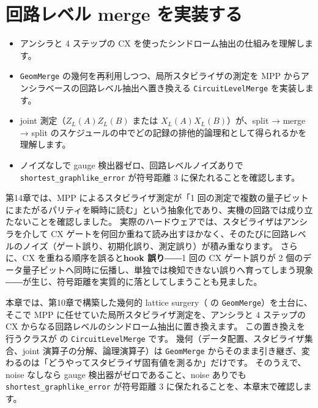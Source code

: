 \chapter{回路レベル merge を実装する}\label{ch:circuit_merge}

\begin{chaptergoal}
  \begin{itemize}
  \item アンシラと 4 ステップの CX を使ったシンドローム抽出の仕組みを理解します。
  \item \texttt{GeomMerge} の幾何を再利用しつつ、局所スタビライザの測定を MPP からアンシラベースの回路レベル抽出へ置き換える \texttt{CircuitLevelMerge} を実装します。
  \item joint 測定（$Z_L(A)Z_L(B)$ または $X_L(A)X_L(B)$）が、split → merge → split のスケジュールの中でどの記録の排他的論理和として得られるかを理解します。
  \item ノイズなしで gauge 検出器ゼロ、回路レベルノイズありで \texttt{shortest\_graphlike\_error} が符号距離 3 に保たれることを確認します。
  \end{itemize}
\end{chaptergoal}

第14章では、MPP によるスタビライザ測定が「1 回の測定で複数の量子ビットにまたがるパリティを瞬時に読む」という抽象化であり、実機の回路では成り立たないことを確認しました。
実際のハードウェアでは、スタビライザはアンシラを介して CX ゲートを何回か重ねて読み出すほかなく、そのたびに回路レベルのノイズ（ゲート誤り、初期化誤り、測定誤り）が積み重なります。
さらに、CX を重ねる順序を誤ると\textbf{hook 誤り}――1 回の CX ゲート誤りが 2 個のデータ量子ビットへ同時に伝播し、単独では検知できない誤りへ育ってしまう現象――が生じ、符号距離を実質的に落としてしまうことも見ました。

本章では、第10章で構築した幾何的 lattice surgery（ の \texttt{GeomMerge}）を土台に、そこで MPP に任せていた局所スタビライザ測定を、アンシラと 4 ステップの CX からなる回路レベルのシンドローム抽出に置き換えます。
この置き換えを行うクラスが  の \texttt{CircuitLevelMerge} です。
幾何（データ配置、スタビライザ集合、joint 演算子の分解、論理演算子）は \texttt{GeomMerge} からそのまま引き継ぎ、変わるのは「どうやってスタビライザ固有値を測るか」だけです。
そのうえで、noise なしなら gauge 検出器がゼロであること、noise ありでも \texttt{shortest\_graphlike\_error} が符号距離 3 に保たれることを、本章末で確認します。

